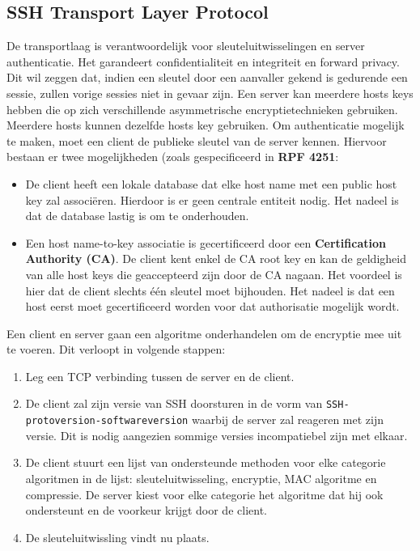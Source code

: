 	\subsection{SSH Transport Layer Protocol}
	De transportlaag is verantwoordelijk voor sleuteluitwisselingen en server authenticatie. Het garandeert confidentialiteit en integriteit en forward privacy. Dit wil zeggen dat, indien een sleutel door een aanvaller gekend is gedurende een sessie, zullen vorige sessies niet in gevaar zijn. Een server kan meerdere hosts keys hebben die op zich verschillende asymmetrische encryptietechnieken gebruiken. Meerdere hosts kunnen dezelfde hosts key gebruiken. Om authenticatie mogelijk te maken, moet een client de publieke sleutel van de server kennen. Hiervoor bestaan er twee mogelijkheden (zoals gespecificeerd in \textbf{RPF 4251}:
	\begin{itemize}
		\item De client heeft een lokale database dat elke host name met een public host key zal associëren. Hierdoor is er geen centrale entiteit nodig. Het nadeel is dat de database lastig is om te onderhouden.
		\item Een host name-to-key associatie is gecertificeerd door een \textbf{Certification Authority (CA)}. De client kent enkel de CA root key en kan de geldigheid van alle host keys die geaccepteerd zijn door de CA nagaan. Het voordeel is hier dat de client slechts één sleutel moet bijhouden. Het nadeel is dat een host eerst moet gecertificeerd worden voor dat authorisatie mogelijk wordt.
	\end{itemize}
	Een client en server gaan een algoritme onderhandelen om de encryptie mee uit te voeren. Dit verloopt in volgende stappen:
	\begin{enumerate}
		\item Leg een TCP verbinding tussen de server en de client.
		\item De client zal zijn versie van SSH doorsturen in de vorm van \texttt{SSH-protoversion-softwareversion} waarbij de server zal reageren met zijn versie. Dit is nodig aangezien sommige versies incompatiebel zijn met elkaar.
		\item De client stuurt een lijst van ondersteunde methoden voor elke categorie algoritmen in de lijst: sleuteluitwisseling, encryptie, MAC algoritme en compressie.
		De server kiest voor elke categorie het algoritme dat hij ook ondersteunt en de voorkeur krijgt door de client.
		\item De sleuteluitwissling vindt nu plaats. 
	\end{enumerate}

